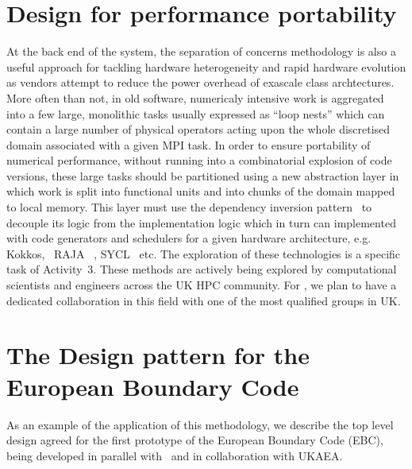 \documentclass{article}
\begin{document}
\section{Design for performance portability}

At the back end of the system, the separation of concerns methodology is also a 
useful approach for tackling hardware heterogeneity and rapid hardware evolution 
as vendors attempt to reduce the power overhead of exascale class archtectures. 
More often than not, in old software, numericaly intensive work is aggregated into 
a few large, monolithic tasks usually expressed as ``loop nests'' which can contain 
a large number of physical operators acting upon the whole discretised domain associated 
with a given MPI task. In order to ensure portability of numerical performance, 
without running into a combinatorial explosion of code versions, these large tasks 
should be partitioned using a new abstraction layer in which work is split into 
functional units and into chunks of the domain mapped to local memory. This layer 
must use the dependency inversion pattern~\cite{ref:11} to decouple its logic from the implementation 
logic which in turn can implemented with code generators and schedulers for a given 
hardware architecture, e.g. Kokkos,~\cite{ref:12} RAJA~\cite{ref:13} , SYCL~\cite{ref:14} etc.
The exploration 
of these technologies is a specific task of Activity~3. These methods are actively 
being explored by computational scientists and engineers across the UK HPC community. 
For \nep, we plan to have a dedicated collaboration in this field with one of 
the most qualified groups in UK.

\section{The Design pattern for the European Boundary Code}

As an example of the application of this methodology, we describe the top level 
design agreed for the first prototype of the European Boundary Code (EBC), being 
developed in parallel with \nep \   and in collaboration with UKAEA. 
\end{document}
